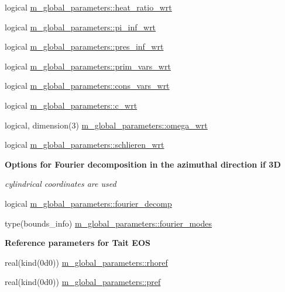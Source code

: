 \begin{Indent}
\begin{DoxyCompactItemize}
\item 
logical \hyperlink{namespacem__global__parameters_ad9c6ef3b20d42a8c3dababd60c20cca3}{m\+\_\+global\+\_\+parameters\+::heat\+\_\+ratio\+\_\+wrt}
\item 
logical \hyperlink{namespacem__global__parameters_afb66fcff0c17f2298a9b7a35c85dedb7}{m\+\_\+global\+\_\+parameters\+::pi\+\_\+inf\+\_\+wrt}
\item 
logical \hyperlink{namespacem__global__parameters_a34bbf8acae0d925bb193265fb2966d1c}{m\+\_\+global\+\_\+parameters\+::pres\+\_\+inf\+\_\+wrt}
\item 
logical \hyperlink{namespacem__global__parameters_a795878d693cec161db5f5c06aea7331e}{m\+\_\+global\+\_\+parameters\+::prim\+\_\+vars\+\_\+wrt}
\item 
logical \hyperlink{namespacem__global__parameters_ad23223100223bdb6d7f59fed5ec7bbb9}{m\+\_\+global\+\_\+parameters\+::cons\+\_\+vars\+\_\+wrt}
\item 
logical \hyperlink{namespacem__global__parameters_a56a071ae0b79b39a826646ace37972eb}{m\+\_\+global\+\_\+parameters\+::c\+\_\+wrt}
\item 
logical, dimension(3) \hyperlink{namespacem__global__parameters_aaf0ab8b40d717a67662251516870b1a6}{m\+\_\+global\+\_\+parameters\+::omega\+\_\+wrt}
\item 
logical \hyperlink{namespacem__global__parameters_acd86b6cea52b83b147f680d9d6da342c}{m\+\_\+global\+\_\+parameters\+::schlieren\+\_\+wrt}
\end{DoxyCompactItemize}
\end{Indent}
\begin{Indent}\textbf{ Options for Fourier decomposition in the azimuthal direction if 3D}\par
{\em cylindrical coordinates are used }\begin{DoxyCompactItemize}
\item 
logical \hyperlink{namespacem__global__parameters_a41c2be7ba7b793490633ce040f949274}{m\+\_\+global\+\_\+parameters\+::fourier\+\_\+decomp}
\item 
type(bounds\+\_\+info) \hyperlink{namespacem__global__parameters_a085b3000bac43a3ff2963646c8ecd96a}{m\+\_\+global\+\_\+parameters\+::fourier\+\_\+modes}
\end{DoxyCompactItemize}
\end{Indent}
\begin{Indent}\textbf{ Reference parameters for Tait E\+OS}\par
\begin{DoxyCompactItemize}
\item 
real(kind(0d0)) \hyperlink{namespacem__global__parameters_a485a360d73013d7bce1daa01df404534}{m\+\_\+global\+\_\+parameters\+::rhoref}
\item 
real(kind(0d0)) \hyperlink{namespacem__global__parameters_aae2170af8a68c7dcdd91910aad867ef4}{m\+\_\+global\+\_\+parameters\+::pref}
\end{DoxyCompactItemize}
\end{Indent}

